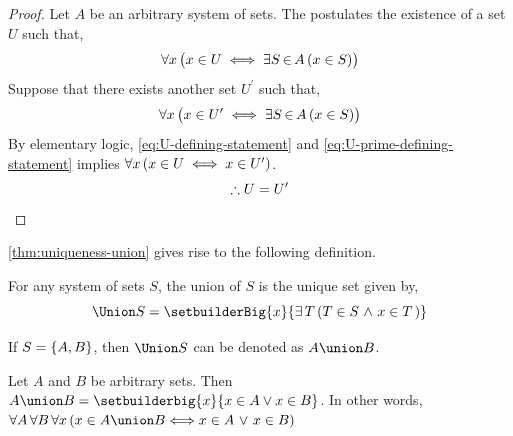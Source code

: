\begin{proof}
    Let \( A \) be an arbitrary system of sets. The  postulates the existence of a set \( U \) such that,
    \begin{equation}
        \label{eq:U-defining-statement}
        \forall x \, \big( x \in U \iff \exists S \, {\in} \, A \, \mleft( x \in S \mright) \big)
    \end{equation}
    Suppose that there exists another set \( U^{\prime} \) such that,
    \begin{equation}
        \label{eq:U-prime-defining-statement}
        \forall x \, \big( x \in U^{\prime} \iff \exists S \,{\in}\, A \, \mleft( x \in S \mright) \big)
    \end{equation}
    By elementary logic, \eqref{eq:U-defining-statement} and \eqref{eq:U-prime-defining-statement} implies
    \( \forall x \, \mleft( x \in U \iff x \in U^{\prime} \mright) \).
    \begin{equation*}
        \therefore U = U^{\prime} \qedhere
    \end{equation*}
\end{proof}

\vspace{0.3cm}
\noindent \cref{thm:uniqueness-union} gives rise to the following definition.
\begin{dfn}[Union]
    \label{dfn:union-of-sets}
    For any system of sets \( S \), the union of \( S \) is the unique set given by,
    \begin{equation*}
        \Union S = \setbuilderBig{x}{\exists \, T \, \mleft( T \in S \,\,{\land}\,\, x \in T \,\mright)}
    \end{equation*}
\end{dfn}

\begin{notation}
    If \( S = \mleft\{ A, B \mright\} \), then \( \Union S \) can be denoted as \( A \union B \).
\end{notation}

\begin{thm}
    \label{thm:union-in-terms-of-logical-or}
    Let \( A \) and \( B \) be arbitrary sets. Then \( A \union B = \setbuilderbig{x}{x \in A \lor x \in B} \). In other words,
    \(  \forall A \, \forall B \, \forall x \, \mleft( x \in A \union B {\iff} x \in A \,\,{\lor}\,\, x \in B \mright) \)
\end{thm}

